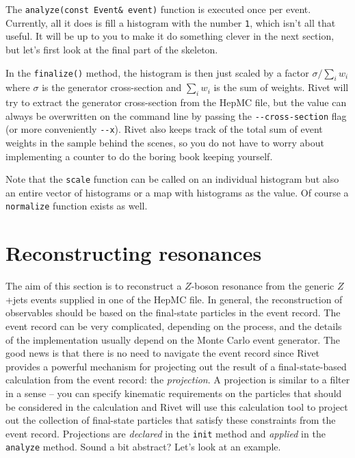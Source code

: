 \documentclass[10pt,fleqn]{scrartcl}
\theoremstyle{exstyle}
\begin{document}
The \verb|analyze(const Event& event)| function is executed once per event.
Currently, all it does is fill a histogram with the number \verb|1|, which
isn't all that useful. It will be up to you to make it do something clever
in the next section, but let's first look at the final part of the skeleton.

In the \verb|finalize()| method, the histogram is then just scaled by a factor 
$\sigma/\sum_i w_i$ where $\sigma$ is the generator cross-section and 
$\sum_i w_i$ is the sum of weights. 
Rivet will try to extract the generator cross-section from the HepMC file,
but the value can always be overwritten on the command line by passing
the \verb|--cross-section| flag (or more conveniently \verb|--x|).
Rivet also keeps track of the total sum of event weights in the sample
behind the scenes, so you do not have to worry about implementing a counter
to do the boring book keeping yourself.

Note that the \verb|scale| function can be called on an individual histogram
but also an entire vector of histograms or a map with histograms as the value.
Of course a \verb|normalize| function exists as well.


\section{Reconstructing resonances}

The aim of this section is to reconstruct a $Z$-boson resonance from the 
generic $Z$+jets events supplied in one of the HepMC file. In general,
the reconstruction of observables should be based on the
final-state particles in the event record. The event record can 
be very complicated, depending on the process, and the details of the 
implementation usually depend on the Monte Carlo event generator.
The good news is that there is no need to navigate the event record 
since Rivet provides a powerful mechanism for projecting out 
the result of a final-state-based calculation 
from the event record: the \emph{projection}. 
A projection is similar to a filter in a sense -- you can specify kinematic
requirements on the particles that should be considered in the calculation 
and Rivet will use this calculation tool to project out 
the collection of final-state particles that satisfy these constraints
from the event record.
Projections are \emph{declared} in the \verb|init| method and
\emph{applied} in the \verb|analyze| method. 
Sound a bit abstract? Let's look at an example.
\end{document}
